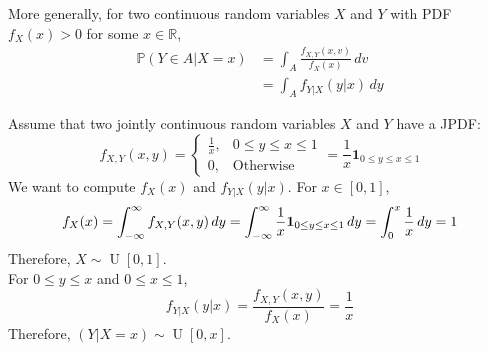 \documentclass{huhtakm-template-book}
\newcommand{\prob}{\mathbb{P}}
\DeclareMathOperator{\U}{U}
\begin{document}
    \newpage
    \begin{rem}
        More generally, for two continuous random variables $X$ and $Y$ with PDF  $f_{X}(x)>0$ for some $x\in\mathbb{R}$,
        \begin{align*}
            \prob(Y\in A|X=x)&=\int_{A}\frac{f_{X,Y}(x,v)}{f_{X}(x)}\,dv\\
            &=\int_{A}f_{Y|X}(y|x)\,dy
        \end{align*}
    \end{rem}
    \begin{eg}
        \label{j.p.d.f. to con.d.f. example}
        Assume that two jointly continuous random variables $X$ and $Y$ have a JPDF:
        \begin{equation*}
            f_{X,Y}(x,y)=\begin{cases}
                \frac{1}{x}, &0\leq y\leq x\leq 1\\
                0, &\text{Otherwise}
            \end{cases}=\frac{1}{x}\mathbf{1}_{0\leq y\leq x\leq 1}
        \end{equation*}
        We want to compute $f_{X}(x)$ and $f_{Y|X}(y|x)$.
        For $x\in [0,1]$,
        \begin{equation*}
            f_{X}(x)=\int_{-\infty}^{\infty} f_{X,Y}(x,y)\,dy=\int_{-\infty}^{\infty}\frac{1}{x}\mathbf{1}_{0\leq y\leq x\leq 1}\,dy=\int_{0}^{x}\frac{1}{x}\,dy=1
        \end{equation*}
        Therefore, $X\sim\U[0,1]$.\\
        For $0\leq y\leq x$ and $0\leq x\leq 1$,
        \begin{equation*}
            f_{Y|X}(y|x)=\frac{f_{X,Y}(x,y)}{f_{X}(x)}=\frac{1}{x}
        \end{equation*}
        Therefore, $(Y|X=x)\sim\U[0,x]$.
    \end{eg}
\end{document}
